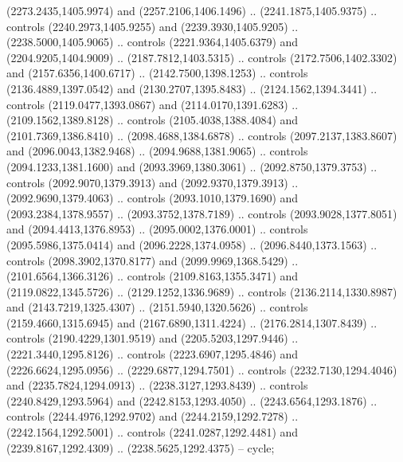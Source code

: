 \begin{scope}[shift={(19.44451,-318.97965)}]
\begin{scope}[shift={(-2093.8013,-1176.4989)}]
\begin{scope}
\begin{scope}
\begin{scope}[cm={{0.24383,0.0,0.0,0.24383,(2162.0441,1469.7571)}}]
            (2273.2435,1405.9974) and (2257.2106,1406.1496) .. (2241.1875,1405.9375) ..
            controls (2240.2973,1405.9255) and (2239.3930,1405.9205) ..
            (2238.5000,1405.9065) .. controls (2221.9364,1405.6379) and
            (2204.9205,1404.9009) .. (2187.7812,1403.5315) .. controls
            (2172.7506,1402.3302) and (2157.6356,1400.6717) .. (2142.7500,1398.1253) ..
            controls (2136.4889,1397.0542) and (2130.2707,1395.8483) ..
            (2124.1562,1394.3441) .. controls (2119.0477,1393.0867) and
            (2114.0170,1391.6283) .. (2109.1562,1389.8128) .. controls
            (2105.4038,1388.4084) and (2101.7369,1386.8410) .. (2098.4688,1384.6878) ..
            controls (2097.2137,1383.8607) and (2096.0043,1382.9468) ..
            (2094.9688,1381.9065) .. controls (2094.1233,1381.1600) and
            (2093.3969,1380.3061) .. (2092.8750,1379.3753) .. controls
            (2092.9070,1379.3913) and (2092.9370,1379.3913) .. (2092.9690,1379.4063) ..
            controls (2093.1010,1379.1690) and (2093.2384,1378.9557) ..
            (2093.3752,1378.7189) .. controls (2093.9028,1377.8051) and
            (2094.4413,1376.8953) .. (2095.0002,1376.0001) .. controls
            (2095.5986,1375.0414) and (2096.2228,1374.0958) .. (2096.8440,1373.1563) ..
            controls (2098.3902,1370.8177) and (2099.9969,1368.5429) ..
            (2101.6564,1366.3126) .. controls (2109.8163,1355.3471) and
            (2119.0822,1345.5726) .. (2129.1252,1336.9689) .. controls
            (2136.2114,1330.8987) and (2143.7219,1325.4307) .. (2151.5940,1320.5626) ..
            controls (2159.4660,1315.6945) and (2167.6890,1311.4224) ..
            (2176.2814,1307.8439) .. controls (2190.4229,1301.9519) and
            (2205.5203,1297.9446) .. (2221.3440,1295.8126) .. controls
            (2223.6907,1295.4846) and (2226.6624,1295.0956) .. (2229.6877,1294.7501) ..
            controls (2232.7130,1294.4046) and (2235.7824,1294.0913) ..
            (2238.3127,1293.8439) .. controls (2240.8429,1293.5964) and
            (2242.8153,1293.4050) .. (2243.6564,1293.1876) .. controls
            (2244.4976,1292.9702) and (2244.2159,1292.7278) .. (2242.1564,1292.5001) ..
            controls (2241.0287,1292.4481) and (2239.8167,1292.4309) ..
            (2238.5625,1292.4375) -- cycle;


\end{scope}
\end{scope}
\end{scope}
\end{scope}
\end{scope}
